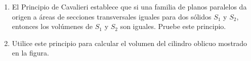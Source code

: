 \item 
\begin{enumerate}
    \item[(a)] El Principio de Cavalieri establece que si una familia de planos paralelos da origen a áreas de secciones transversales iguales para dos sólidos $S_1$ y $S_2$, entonces los volúmenes de $S_1$ y $S_2$ son iguales. Pruebe este principio.
    \item[(b)] Utilice este principio para calcular el volumen del cilindro oblicuo mostrado en la figura.
\end{enumerate}
\begin{center}
\end{center}
